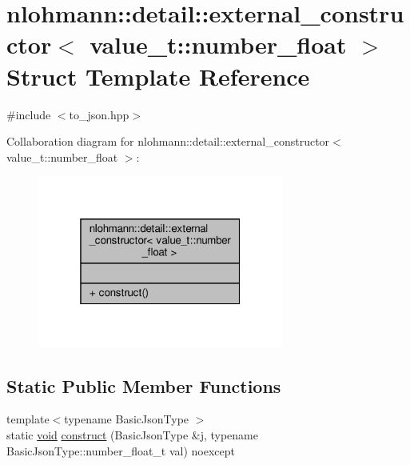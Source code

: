 \hypertarget{structnlohmann_1_1detail_1_1external__constructor_3_01value__t_1_1number__float_01_4}{}\section{nlohmann\+:\+:detail\+:\+:external\+\_\+constructor$<$ value\+\_\+t\+:\+:number\+\_\+float $>$ Struct Template Reference}
\label{structnlohmann_1_1detail_1_1external__constructor_3_01value__t_1_1number__float_01_4}


{\ttfamily \#include $<$to\+\_\+json.\+hpp$>$}



Collaboration diagram for nlohmann\+:\+:detail\+:\+:external\+\_\+constructor$<$ value\+\_\+t\+:\+:number\+\_\+float $>$\+:\nopagebreak
\begin{figure}[H]
\begin{center}
\leavevmode
\includegraphics[width=229pt]{structnlohmann_1_1detail_1_1external__constructor_3_01value__t_1_1number__float_01_4__coll__graph}
\end{center}
\end{figure}
\subsection*{Static Public Member Functions}
\begin{DoxyCompactItemize}
\item 
{\footnotesize template$<$typename Basic\+Json\+Type $>$ }\\static \hyperlink{namespacenlohmann_1_1detail_a59fca69799f6b9e366710cb9043aa77d}{void} \hyperlink{structnlohmann_1_1detail_1_1external__constructor_3_01value__t_1_1number__float_01_4_a669df5a4d258b588e67f747c6d656cdb}{construct} (Basic\+Json\+Type \&j, typename Basic\+Json\+Type\+::number\+\_\+float\+\_\+t val) noexcept
\end{DoxyCompactItemize}


